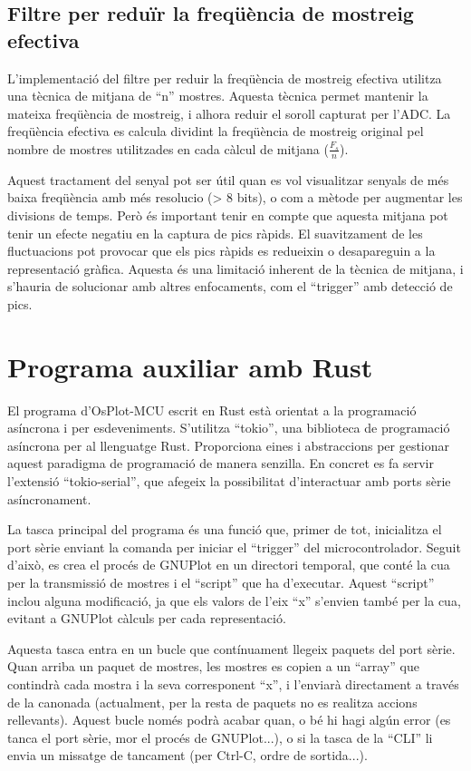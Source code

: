 \documentclass{tfgitic}[2023/06/30]
\begin{document}
\subsection{Filtre per reduïr la freqüència de mostreig efectiva}

L'implementació del filtre per reduir la freqüència de mostreig
efectiva utilitza una tècnica de mitjana de ``n'' mostres. Aquesta
tècnica permet mantenir la mateixa freqüència de mostreig, i alhora
reduir el soroll capturat per l'ADC. La freqüència efectiva es calcula
dividint la freqüència de mostreig original pel nombre de mostres
utilitzades en cada càlcul de mitjana ($\frac{F_{s}}{n}$).

Aquest tractament del senyal pot ser útil quan es vol visualitzar
senyals de més baixa freqüència amb més resolucio (> 8 bits), o com a
mètode per augmentar les divisions de temps. Però és important tenir
en compte que aquesta mitjana pot tenir un efecte negatiu en la
captura de pics ràpids. El suavitzament de les fluctuacions pot
provocar que els pics ràpids es redueixin o desapareguin a la
representació gràfica. Aquesta és una limitació inherent de la tècnica
de mitjana, i s'hauria de solucionar amb altres enfocaments, com el
``trigger'' amb detecció de pics.

\section{Programa auxiliar amb Rust}

El programa d'OsPlot-MCU escrit en Rust està orientat a la programació
asíncrona i per esdeveniments. S'utilitza ``tokio'', una biblioteca
de programació asíncrona per al llenguatge Rust. Proporciona eines
i abstraccions per gestionar aquest paradigma de programació de
manera senzilla. En concret es fa servir l'extensió ``tokio-serial'',
que afegeix la possibilitat d'interactuar amb ports sèrie
asíncronament.

\newpage

La tasca principal del programa és una funció que, primer de tot,
inicialitza el port sèrie enviant la comanda per iniciar el
``trigger'' del microcontrolador. Seguit d'això, es crea el procés de
GNUPlot en un directori temporal, que conté la cua per la transmissió
de mostres i el ``script'' que ha d'executar.  Aquest ``script''
inclou alguna modificació, ja que els valors de l'eix ``x'' s'envien
també per la cua, evitant a GNUPlot càlculs per cada representació.

Aquesta tasca entra en un bucle que contínuament llegeix paquets del
port sèrie. Quan arriba un paquet de mostres, les mostres es copien a
un ``array'' que contindrà cada mostra i la seva corresponent ``x'', i
l'enviarà directament a través de la canonada (actualment, per la
resta de paquets no es realitza accions rellevants). Aquest bucle
només podrà acabar quan, o bé hi hagi algún error (es tanca el port
sèrie, mor el procés de GNUPlot...), o si la tasca de la ``CLI'' li
envia un missatge de tancament (per Ctrl-C, ordre de sortida...).
\end{document}

